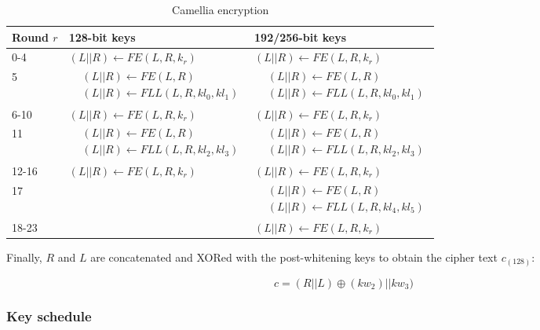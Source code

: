 \begin{table}[h!]
    \centering
    \caption{Camellia encryption}
    \begin{tabular}{lll}
        \toprule
        Round $r$ & 128-bit keys & 192/256-bit keys \\
        \midrule
        0-4 & $(L||R)\leftarrow FE(L,R,k_r)$ & $(L||R)\leftarrow FE(L,R,k_r)$ \\
        \midrule
        5 & {$\!\begin{aligned}&(L||R)\leftarrow FE(L,R)\\&(L||R)\leftarrow FLL(L,R,kl_0,kl_1)\end{aligned}$} & {$\!\begin{aligned}&(L||R)\leftarrow FE(L,R)\\&(L||R)\leftarrow FLL(L,R,kl_0,kl_1)\end{aligned}$} \\
        \midrule
        6-10 & $(L||R)\leftarrow FE(L,R,k_r)$ & $(L||R)\leftarrow FE(L,R,k_r)$ \\
        \midrule
        11 & {$\!\begin{aligned}&(L||R)\leftarrow FE(L,R)\\&(L||R)\leftarrow FLL(L,R,kl_2,kl_3)\end{aligned}$} & {$\!\begin{aligned}&(L||R)\leftarrow FE(L,R)\\&(L||R)\leftarrow FLL(L,R,kl_2,kl_3)\end{aligned}$} \\
        \midrule
        12-16 & $(L||R)\leftarrow FE(L,R,k_r)$ & $(L||R)\leftarrow FE(L,R,k_r)$ \\
        \midrule
        17 & & {$\!\begin{aligned}&(L||R)\leftarrow FE(L,R)\\&(L||R)\leftarrow FLL(L,R,kl_4,kl_5)\end{aligned}$} \\
        \midrule
        18-23 & & $(L||R)\leftarrow FE(L,R,k_r)$ \\
        \bottomrule
    \end{tabular}
\end{table}

Finally, $R$ and $L$ are concatenated and XORed with the post-whitening keys to
obtain the cipher text $c_{(128)}$:

\[
    c=(R||L)\oplus (kw_2)||kw_3)
\]

\subsubsection{Key schedule}

